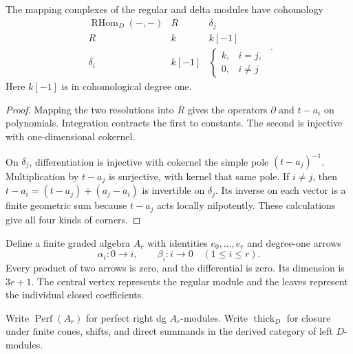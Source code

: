 \begin{lemma}\label{cbc:ac:puncture-hom}
The mapping complexes of the regular and delta modules
have cohomology
\[
 \begin{array}{c|cc}
  \operatorname{RHom}_D(-,-)&R&\delta_j\\ \hline
  R&k&k[-1]\\
  \delta_i&k[-1]&
       \begin{cases}k,&i=j,\\0,&i\ne j\end{cases}
 \end{array}.
\]
Here $k[-1]$ is in cohomological degree one.
\end{lemma}
\begin{proof}
Mapping the two resolutions into $R$ gives the operators
$\partial$ and $t-a_i$ on polynomials. Integration
contracts the first to constants. The second is injective
with one-dimensional cokernel.

On $\delta_j$, differentiation is injective with cokernel
the simple pole $(t-a_j)^{-1}$. Multiplication by $t-a_j$
is surjective, with kernel that same pole. If $i\ne j$,
then $t-a_i=(t-a_j)+(a_j-a_i)$ is invertible on
$\delta_j$. Its inverse on each vector is a finite
geometric sum because $t-a_j$ acts locally nilpotently.
These calculations give all four kinds of corners.
\end{proof}

Define a finite graded algebra $A_r$ with identities
$e_0,\ldots,e_r$ and degree-one arrows
\[
 \alpha_i:0\longrightarrow i,\qquad
 \beta_i:i\longrightarrow0\quad(1\leq i\leq r).
\]
Every product of two arrows is zero, and the differential
is zero. Its dimension is $3r+1$. The central vertex
represents the regular module and the leaves represent
the individual closed coefficients.

Write $\operatorname{Perf}(A_r)$ for perfect right dg
$A_r$-modules. Write $\operatorname{thick}_D$ for closure
under finite cones, shifts, and direct summands in the
derived category of left $D$-modules.

